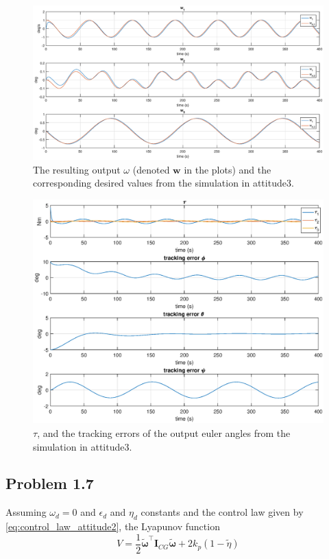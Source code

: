 \begin{figure}
	\centering
	\includegraphics[width=1.00\textwidth]{figures/3_omega.eps}
	\caption{The resulting output $\omega$ (denoted $\mathbf{w}$ in the plots) and the corresponding desired values from the simulation in attitude3.}
\label{fig:sim_attitude3_omega}
\end{figure}

\begin{figure}
	\centering
	\includegraphics[width=1.00\textwidth]{figures/3_tau_track.eps}
	\caption{ $\tau$, and the tracking errors of the output euler angles from the simulation in attitude3.}
\label{fig:sim_attitude3_track}
\end{figure}

\subsection*{Problem 1.7}
Assuming $\omega_d = 0$ and $\epsilon_d$ and $\eta_d$ constants and the control law given by \eqref{eq:control_law_attitude2}, the Lyapunov function 
 \begin{equation}
	 V = \frac{1}{2} \tilde{\boldsymbol{\omega}}^{\top} \mathbf{I}_{CG}\tilde{\boldsymbol{\omega}} + 2 k_p (1-\tilde{\eta})
 \end{equation}
 
